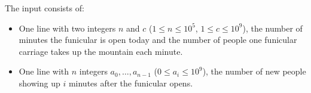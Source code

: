 
    The input consists of:
    \begin{itemize}
		\item One line with two integers $n$ and $c$ ($1 \leq n \leq 10^5$, $1 \leq c \leq 10^9$),
            the number of minutes the funicular is open today and
            the number of people one funicular carriage takes up the mountain each minute.
		\item One line with $n$ integers $a_0, \dots, a_{n-1}$ ($0 \leq a_i \leq 10^9$),
            the number of new people showing up $i$ minutes after the funicular opens.
    \end{itemize}
